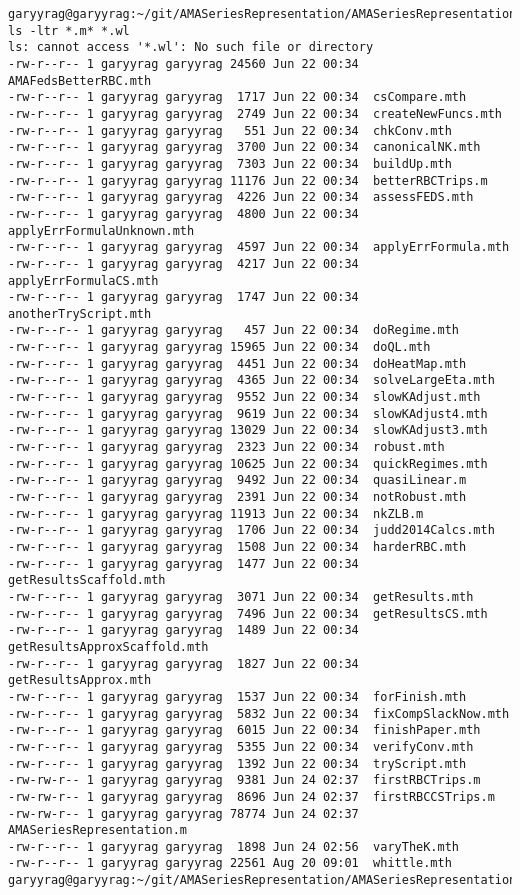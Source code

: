 \documentclass[hyperref]{labbook}
\begin{document}
\begin{verbatim}
garyyrag@garyyrag:~/git/AMASeriesRepresentation/AMASeriesRepresentation$ ls -ltr *.m* *.wl
ls: cannot access '*.wl': No such file or directory
-rw-r--r-- 1 garyyrag garyyrag 24560 Jun 22 00:34  AMAFedsBetterRBC.mth
-rw-r--r-- 1 garyyrag garyyrag  1717 Jun 22 00:34  csCompare.mth
-rw-r--r-- 1 garyyrag garyyrag  2749 Jun 22 00:34  createNewFuncs.mth
-rw-r--r-- 1 garyyrag garyyrag   551 Jun 22 00:34  chkConv.mth
-rw-r--r-- 1 garyyrag garyyrag  3700 Jun 22 00:34  canonicalNK.mth
-rw-r--r-- 1 garyyrag garyyrag  7303 Jun 22 00:34  buildUp.mth
-rw-r--r-- 1 garyyrag garyyrag 11176 Jun 22 00:34  betterRBCTrips.m
-rw-r--r-- 1 garyyrag garyyrag  4226 Jun 22 00:34  assessFEDS.mth
-rw-r--r-- 1 garyyrag garyyrag  4800 Jun 22 00:34  applyErrFormulaUnknown.mth
-rw-r--r-- 1 garyyrag garyyrag  4597 Jun 22 00:34  applyErrFormula.mth
-rw-r--r-- 1 garyyrag garyyrag  4217 Jun 22 00:34  applyErrFormulaCS.mth
-rw-r--r-- 1 garyyrag garyyrag  1747 Jun 22 00:34  anotherTryScript.mth
-rw-r--r-- 1 garyyrag garyyrag   457 Jun 22 00:34  doRegime.mth
-rw-r--r-- 1 garyyrag garyyrag 15965 Jun 22 00:34  doQL.mth
-rw-r--r-- 1 garyyrag garyyrag  4451 Jun 22 00:34  doHeatMap.mth
-rw-r--r-- 1 garyyrag garyyrag  4365 Jun 22 00:34  solveLargeEta.mth
-rw-r--r-- 1 garyyrag garyyrag  9552 Jun 22 00:34  slowKAdjust.mth
-rw-r--r-- 1 garyyrag garyyrag  9619 Jun 22 00:34  slowKAdjust4.mth
-rw-r--r-- 1 garyyrag garyyrag 13029 Jun 22 00:34  slowKAdjust3.mth
-rw-r--r-- 1 garyyrag garyyrag  2323 Jun 22 00:34  robust.mth
-rw-r--r-- 1 garyyrag garyyrag 10625 Jun 22 00:34  quickRegimes.mth
-rw-r--r-- 1 garyyrag garyyrag  9492 Jun 22 00:34  quasiLinear.m
-rw-r--r-- 1 garyyrag garyyrag  2391 Jun 22 00:34  notRobust.mth
-rw-r--r-- 1 garyyrag garyyrag 11913 Jun 22 00:34  nkZLB.m
-rw-r--r-- 1 garyyrag garyyrag  1706 Jun 22 00:34  judd2014Calcs.mth
-rw-r--r-- 1 garyyrag garyyrag  1508 Jun 22 00:34  harderRBC.mth
-rw-r--r-- 1 garyyrag garyyrag  1477 Jun 22 00:34  getResultsScaffold.mth
-rw-r--r-- 1 garyyrag garyyrag  3071 Jun 22 00:34  getResults.mth
-rw-r--r-- 1 garyyrag garyyrag  7496 Jun 22 00:34  getResultsCS.mth
-rw-r--r-- 1 garyyrag garyyrag  1489 Jun 22 00:34  getResultsApproxScaffold.mth
-rw-r--r-- 1 garyyrag garyyrag  1827 Jun 22 00:34  getResultsApprox.mth
-rw-r--r-- 1 garyyrag garyyrag  1537 Jun 22 00:34  forFinish.mth
-rw-r--r-- 1 garyyrag garyyrag  5832 Jun 22 00:34  fixCompSlackNow.mth
-rw-r--r-- 1 garyyrag garyyrag  6015 Jun 22 00:34  finishPaper.mth
-rw-r--r-- 1 garyyrag garyyrag  5355 Jun 22 00:34  verifyConv.mth
-rw-r--r-- 1 garyyrag garyyrag  1392 Jun 22 00:34  tryScript.mth
-rw-rw-r-- 1 garyyrag garyyrag  9381 Jun 24 02:37  firstRBCTrips.m
-rw-rw-r-- 1 garyyrag garyyrag  8696 Jun 24 02:37  firstRBCCSTrips.m
-rw-rw-r-- 1 garyyrag garyyrag 78774 Jun 24 02:37  AMASeriesRepresentation.m
-rw-r--r-- 1 garyyrag garyyrag  1898 Jun 24 02:56  varyTheK.mth
-rw-r--r-- 1 garyyrag garyyrag 22561 Aug 20 09:01  whittle.mth
garyyrag@garyyrag:~/git/AMASeriesRepresentation/AMASeriesRepresentation$ 
\end{verbatim}
\end{document}
